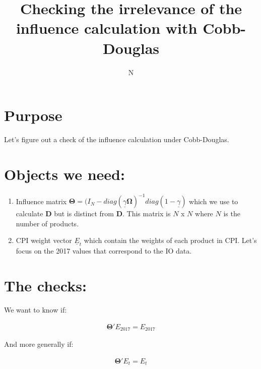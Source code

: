 \documentclass[12pt,english]{article}
\begin{document}
\title{Checking the irrelevance of the influence calculation with Cobb-Douglas}
\author{N}
\maketitle
\vspace{-1.2cm}
\section{Purpose}
Let's figure out a check of the influence calculation under Cobb-Douglas.

\section{Objects we need:}

\begin{enumerate}
	\item Influence matrix $\mathbold{\Theta} = (I_N - diag(\underline{\gamma}\mathbold{\Omega})^{-1}diag(1-\underline{\gamma})$ which we use to calculate $\mathbold{D}$ but is distinct from $\mathbold{D}$. This matrix is $N$ x $N$ where $N$ is the number of products.
	\item CPI weight vector $\underline{E}_t$ which contain the weights of each product in CPI. Let's focus on the 2017 values that correspond to the IO data.
\end{enumerate}

\section{The checks:}

We want to know if:

\begin{align*}
	\mathbold{\Theta}'E_{2017} = E_{2017}
\end{align*}

And more generally if:

\begin{align*}
	\mathbold{\Theta}'E_{t} = E_{t}
\end{align*}
\end{document}
